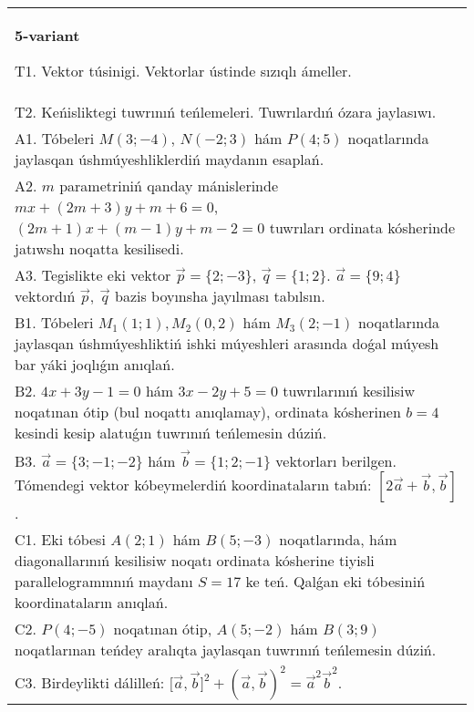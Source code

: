 \documentclass{article}
\begin{document}
\begin{tabular}{m{17cm}}
\textbf{5-variant}
\newline

T1. 
Vektor túsinigi. Vektorlar ústinde sızıqlı ámeller.
 \\
T2. 
Keńisliktegi tuwrınıń teńlemeleri. Tuwrılardıń ózara jaylasıwı.
 \\
A1. 
Tóbeleri $M(3;-4)$, $N(-2;3)$ hám $P(4;5)$ 
noqatlarında jaylasqan úshmúyeshliklerdiń maydanın esaplań.
 \\
A2. 
$m$ parametriniń qanday mánislerinde 
$mx+(2m+3)y+m+6=0$, $(2m+1)x+(m-1)y+m-2=0$ tuwrıları ordinata
kósherinde jatıwshı noqatta kesilisedi.
 \\
A3. 
Tegislikte eki vektor
$\overrightarrow{p} = \{ 2; - 3\}$, $\overrightarrow{q} = \{ 1;2\}$.
$\overrightarrow{a} = \{9;4\}$ vektordıń
$\overrightarrow{p},\ \overrightarrow{q}$ bazis boyınsha jayılması tabılsın.
 \\
B1. 
Tóbeleri \(M_{1}(1;1), M_{2}(0,2)\) hám
\(M_{3}(2;-1)\) noqatlarında jaylasqan úshmúyeshliktiń ishki
múyeshleri arasında doǵal múyesh bar yáki joqlıǵın anıqlań.
 \\
B2. 
\(4x+3y-1=0\) hám \(3x-2y+5=0\)
tuwrılarınıń kesilisiw noqatınan ótip (bul noqattı anıqlamay), ordinata
kósherinen \(b=4\) kesindi kesip alatuǵın tuwrınıń teńlemesin dúziń.
 \\
B3. 
$\vec{a} = \{ 3; - 1; - 2\}$ hám $\vec{b} = \{ 1;2; - 1\}$ vektorları berilgen. Tómendegi vektor kóbeymelerdiń koordinataların tabıń: 
$\left\lbrack 2\vec{a} + \vec{b},\vec{b} \right\rbrack$.
 \\
C1. 
Eki tóbesi \(A(2;1)\) hám \(B(5; - 3)\) noqatlarında, hám
diagonallarınıń kesilisiw noqatı ordinata kósherine tiyisli
parallelogrammnıń maydanı \(S = 17\) ke teń. Qalǵan eki tóbesiniń
koordinataların anıqlań. \\
C2. 
\(P(4; - 5)\) noqatınan ótip,
\(A(5; - 2)\) hám \(B(3;9)\) noqatlarınan teńdey aralıqta jaylasqan
tuwrınıń teńlemesin dúziń.
 \\
C3. 
Birdeylikti dálilleń: \(\lbrack\vec{a},\vec{b}\rbrack^{2} + (\vec{a},\vec{b}) ^{2} = {\vec{a}}^{2}{\vec{b}}^{2}\).
 \\

\end{tabular}
\vspace{1cm}
\end{document}
